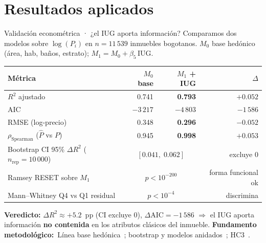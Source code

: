 \documentclass[aspectratio=169,11pt]{beamer}
\newcommand{\hi}[1]{\textcolor{inmuGreen}{\textbf{#1}}}
\newcommand{\framenote}[1]{%
  \vfill
  {\scriptsize\color{inmuMuted}\textbf{Fundamento metodológico:}\ #1}%
}
\begin{document}
\section{Resultados aplicados}

\begin{frame}{Validación econométrica · ¿el IUG aporta información?}
  {\footnotesize Comparamos dos modelos sobre $\log(P_i)$ en $n=11\,539$ inmuebles bogotanos. $M_0$ base hedónico (área, hab, baños, estrato); $M_1 = M_0 + \beta_5\,\text{IUG}$.}

  \begin{center}
  \scriptsize
  \renewcommand{\arraystretch}{0.95}
  \begin{tabular}{lrrr}
    \toprule
    \textbf{Métrica} & \textbf{$M_0$ base} & \textbf{$M_1$ + IUG} & \textbf{$\Delta$} \\
    \midrule
    $R^2$ ajustado                       & 0.741 & \hi{0.793} & $+0.052$ \\
    AIC                                  & $-3\,217$ & \hi{$-4\,803$} & $-1\,586$ \\
    RMSE (log-precio)                    & 0.348 & \hi{0.296} & $-0.052$ \\
    $\rho_\text{Spearman}$ ($\hat{P}$ vs $P$) & 0.945 & \hi{0.998} & $+0.053$ \\
    \addlinespace
    Bootstrap CI 95\% $\Delta R^2$ ($n_{\text{rep}}=10\,000$) & \multicolumn{2}{c}{$[0.041,\;0.062]$} & excluye 0 \\
    Ramsey RESET sobre $M_1$             & \multicolumn{2}{c}{$p < 10^{-200}$} & forma funcional ok \\
    Mann--Whitney Q4 vs Q1 residual      & \multicolumn{2}{c}{$p < 10^{-4}$} & discrimina \\
    \bottomrule
  \end{tabular}
  \end{center}

  {\scriptsize\hi{Veredicto:} $\Delta R^2 \approx +5.2$~pp (CI excluye 0), $\Delta\text{AIC}=-1\,586$ $\Rightarrow$ el IUG aporta información \hi{no contenida} en los atributos clásicos del inmueble.}
  \framenote{Línea base hedónica~\cite{rosen1974,Khoshnoud2023}; bootstrap y modelos anidados~\cite{nardo2008,roberts2017}; HC3~\cite{wheeler2007}.}
\end{frame}
\end{document}

